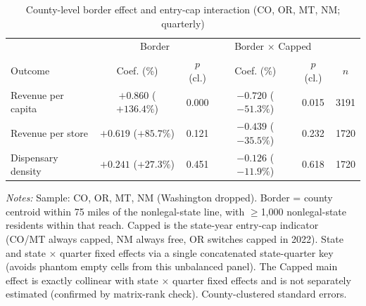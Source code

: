 \begin{table}[htbp]
\centering
\caption{County-level border effect and entry-cap interaction (CO, OR, MT, NM; quarterly)}
\label{tab:county_border_capped_main}
\footnotesize
\begin{tabular}{lccccc}
\toprule
& \multicolumn{2}{c}{Border} & \multicolumn{2}{c}{Border $\times$ Capped} & \\
Outcome & Coef. (\%) & $p$ (cl.) & Coef. (\%) & $p$ (cl.) & $n$ \\
\midrule
Revenue per capita & $+0.860$ ($+136.4\%$) & 0.000 & $-0.720$ ($-51.3\%$) & 0.015 & 3191 \\
Revenue per store & $+0.619$ ($+85.7\%$) & 0.121 & $-0.439$ ($-35.5\%$) & 0.232 & 1720 \\
Dispensary density & $+0.241$ ($+27.3\%$) & 0.451 & $-0.126$ ($-11.9\%$) & 0.618 & 1720 \\
\bottomrule
\end{tabular}
\begin{minipage}{0.98\textwidth}
\vspace{0.3em}
\footnotesize
\textit{Notes:} Sample: CO, OR, MT, NM (Washington dropped). Border = county centroid within 75 miles of the
nonlegal-state line, with $\geq$1,000 nonlegal-state residents within that reach. Capped is the state-year
entry-cap indicator (CO/MT always capped, NM always free, OR switches capped in 2022). State and state
$\times$ quarter fixed effects via a single concatenated state-quarter key (avoids phantom empty cells from
this unbalanced panel). The Capped main effect is exactly collinear with state $\times$ quarter fixed effects
and is not separately estimated (confirmed by matrix-rank check). County-clustered standard errors.
\end{minipage}
\end{table}

